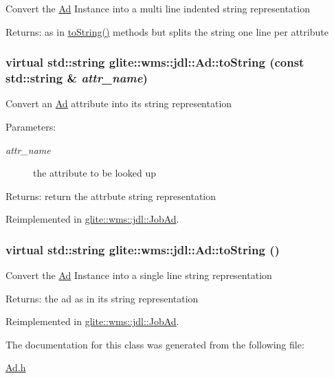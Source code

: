 Convert the \hyperlink{classglite_1_1wms_1_1jdl_1_1Ad}{Ad} Instance into a multi line indented string representation \begin{Desc}
\item[Returns:]as in \hyperlink{classglite_1_1wms_1_1jdl_1_1Ad_z15_0}{to\-String()} methods but splits the string one line per attribute \end{Desc}
\hypertarget{classglite_1_1wms_1_1jdl_1_1Ad_z15_1}{
\subsubsection[toString]{\setlength{\rightskip}{0pt plus 5cm}virtual std::string glite::wms::jdl::Ad::to\-String (const std::string \& {\em attr\_\-name})}}
\label{classglite_1_1wms_1_1jdl_1_1Ad_z15_1}


Convert an \hyperlink{classglite_1_1wms_1_1jdl_1_1Ad}{Ad} attribute into its string representation \begin{Desc}
\item[Parameters:]
\begin{description}
\item[{\em attr\_\-name}]the attribute to be looked up \end{description}
\end{Desc}
\begin{Desc}
\item[Returns:]return the attrbute string representation \end{Desc}


Reimplemented in \hyperlink{classglite_1_1wms_1_1jdl_1_1JobAd_z3_2}{glite::wms::jdl::Job\-Ad}.\hypertarget{classglite_1_1wms_1_1jdl_1_1Ad_z15_0}{
\subsubsection[toString]{\setlength{\rightskip}{0pt plus 5cm}virtual std::string glite::wms::jdl::Ad::to\-String ()}}
\label{classglite_1_1wms_1_1jdl_1_1Ad_z15_0}


Convert the \hyperlink{classglite_1_1wms_1_1jdl_1_1Ad}{Ad} Instance into a single line string representation \begin{Desc}
\item[Returns:]the ad as in its string representation \end{Desc}


Reimplemented in \hyperlink{classglite_1_1wms_1_1jdl_1_1JobAd_z3_1}{glite::wms::jdl::Job\-Ad}.

The documentation for this class was generated from the following file:\begin{CompactItemize}
\item 
\hyperlink{Ad_8h}{Ad.h}\end{CompactItemize}
